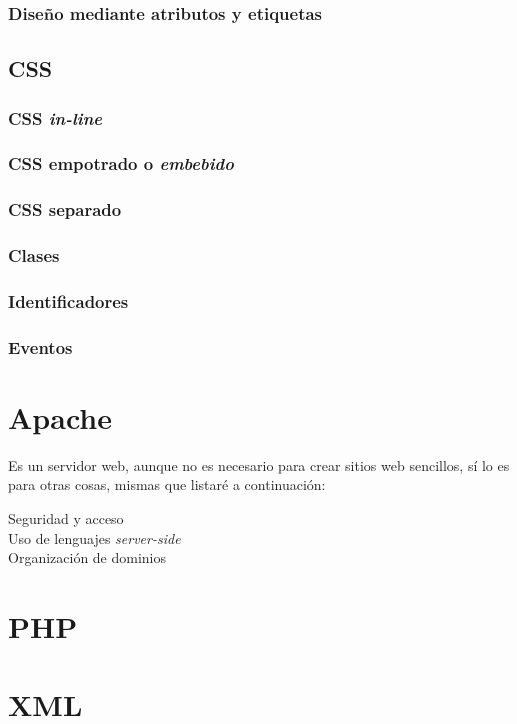 \documentclass[12pt,spanish,lettersize]{book}
\begin{document}
\subsubsection{Dise\~no mediante atributos y etiquetas}
\subsection{CSS}
\subsubsection{CSS \emph{in-line}}
\subsubsection{CSS empotrado o \emph{embebido}}
\subsubsection{CSS separado}
\subsubsection{Clases}
\subsubsection{Identificadores}
\subsubsection{Eventos}
\section{Apache}
Es un servidor web, aunque no es necesario para crear sitios web sencillos, s\'i lo es para otras cosas, mismas que listar\'e a continuaci\'on:
\begin{description}
\item[Seguridad y acceso]
\item[Uso de lenguajes \emph{server-side}]
\item[Organizaci\'on de dominios]
\end{description}
\section{PHP}
\section{XML}
\end{document}
